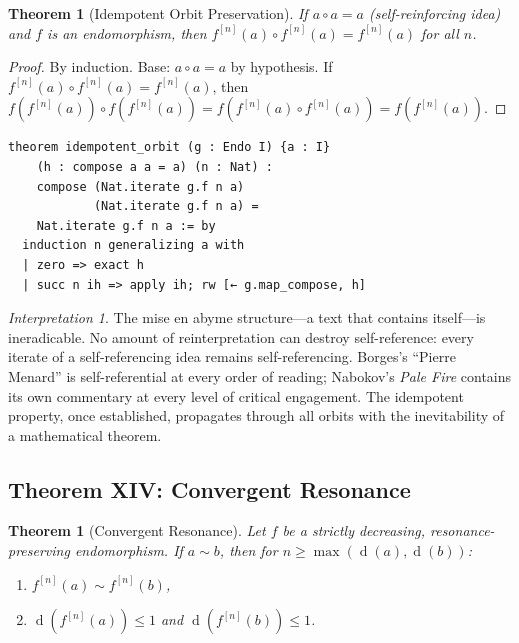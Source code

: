 \documentclass[11pt,openany]{book}
\theoremstyle{definition}
\theoremstyle{plain}
\newtheorem{theorem}[axiom]{Theorem}
\theoremstyle{remark}
\newtheorem{interpretation}[axiom]{Interpretation}
\newcommand{\compose}{\circ}                 %
\newcommand{\res}{\sim}                      %
\newcommand{\depth}{\operatorname{d}}       %
\begin{document}
\begin{theorem}[Idempotent Orbit Preservation]
\label{thm:key-idempotent}
If $a \compose a = a$ (self-reinforcing idea) and $f$ is an endomorphism, then $f^{[n]}(a) \compose f^{[n]}(a) = f^{[n]}(a)$ for all $n$.
\end{theorem}

\begin{proof}
By induction. Base: $a \compose a = a$ by hypothesis. If $f^{[n]}(a) \compose f^{[n]}(a) = f^{[n]}(a)$, then $f(f^{[n]}(a)) \compose f(f^{[n]}(a)) = f(f^{[n]}(a) \compose f^{[n]}(a)) = f(f^{[n]}(a))$.
\end{proof}

\begin{lstlisting}[language=Lean4]
theorem idempotent_orbit (g : Endo I) {a : I}
    (h : compose a a = a) (n : Nat) :
    compose (Nat.iterate g.f n a)
            (Nat.iterate g.f n a) =
    Nat.iterate g.f n a := by
  induction n generalizing a with
  | zero => exact h
  | succ n ih => apply ih; rw [← g.map_compose, h]
\end{lstlisting}

\begin{interpretation}
The mise en abyme structure---a text that contains itself---is ineradicable. No amount of reinterpretation can destroy self-reference: every iterate of a self-referencing idea remains self-referencing. Borges's ``Pierre Menard'' is self-referential at every order of reading; Nabokov's \textit{Pale Fire} contains its own commentary at every level of critical engagement. The idempotent property, once established, propagates through all orbits with the inevitability of a mathematical theorem.
\end{interpretation}

\subsection{Theorem XIV: Convergent Resonance}

\begin{theorem}[Convergent Resonance]
\label{thm:key-convergent}
Let $f$ be a strictly decreasing, resonance-preserving endomorphism. If $a \res b$, then for $n \geq \max(\depth(a), \depth(b))$:
\begin{enumerate}
\item $f^{[n]}(a) \res f^{[n]}(b)$,
\item $\depth(f^{[n]}(a)) \leq 1$ and $\depth(f^{[n]}(b)) \leq 1$.
\end{enumerate}
\end{theorem}
\end{document}
